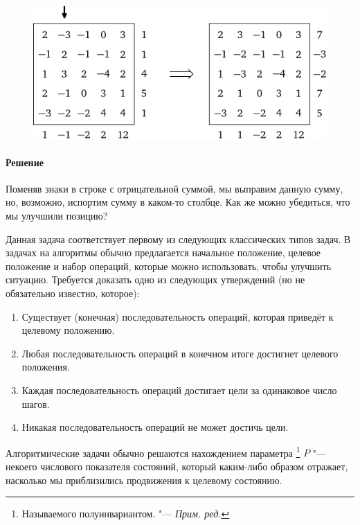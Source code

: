 \documentclass[twoside]{book}
\begin{document}
\begin{figure}[h]
\vspace{-\jot}
\centering
\includegraphics[scale=.85]{mp/wink-16}
\vspace{-\jot}
\end{figure}

\paragraph{Решение}
Поменяв знаки в строке с отрицательной суммой, мы выправим данную сумму, но, возможно, испортим сумму в каком-то столбце.
Как же можно убедиться, что мы улучшили позицию?



Данная задача соответствует первому из следующих классических типов задач.
В задачах на алгоритмы обычно предлагается начальное положение, целевое положение и набор операций, которые можно использовать, чтобы улучшить ситуацию.
Требуется доказать одно из следующих утверждений (но не обязательно известно, которое):
\begin{enumerate}[label=(\arabic*),noitemsep,leftmargin=\parindent,labelsep=3.5pt]
\item Существует (конечная) последовательность операций, которая приведёт к целевому положению.
\item Любая последовательность операций в конечном итоге достигнет целевого положения.
\item Каждая последовательность операций достигает цели за одинаковое число шагов.
\item Никакая последовательность операций не может достичь цели.
\end{enumerate}

Алгоритмические задачи обычно решаются нахождением параметра%
\footnote{Называемого полуинвариантом. "--- \emph{Прим. ред.}}
$P$ "--- некоего числового показателя состояний, который каким-либо
образом отражает, насколько мы приблизились продвижения к целевому состоянию.
\end{document}
